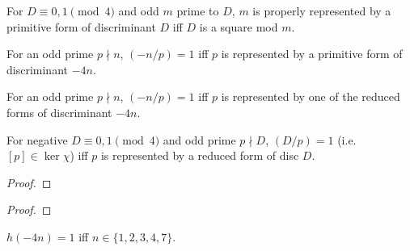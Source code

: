 \begin{theorem}
  \label{lem:repr_iff_isSquare_general}
  \leanok
  For $D \equiv 0,1 \pmod 4$ and odd $m$ prime to $D$, $m$ is properly represented
  by a primitive form of discriminant $D$ iff $D$ is a square mod $m$.
\end{theorem}

\begin{theorem}
  \label{cor:c2_6}
  \leanok
  For an odd prime $p \nmid n$, $(-n/p)=1$ iff $p$ is represented by a primitive
  form of discriminant $-4n$.
\end{theorem}

\begin{theorem}
  \label{prop:p2_15}
  \leanok
  For an odd prime $p \nmid n$, $(-n/p)=1$ iff $p$ is represented by one of the
  reduced forms of discriminant $-4n$.
\end{theorem}

\begin{theorem}
  \label{thm:t2_16}
  \leanok
  For negative $D \equiv 0,1 \pmod 4$ and odd prime $p \nmid D$, $(D/p)=1$
  (i.e.\ $[p] \in \ker\chi$) iff $p$ is represented by a reduced form of disc $D$.
\end{theorem}

\begin{theorem}
  \label{eq:comp_2_30}
  \leanok
\end{theorem}
\begin{proof}\leanok\end{proof}

\begin{theorem}
  \label{eq:comp_2_31}
  \leanok
\end{theorem}
\begin{proof}\leanok\end{proof}

\begin{theorem}
  \label{thm:landau}
  \leanok
  $h(-4n)=1$ iff $n \in \{1,2,3,4,7\}$.
\end{theorem}

